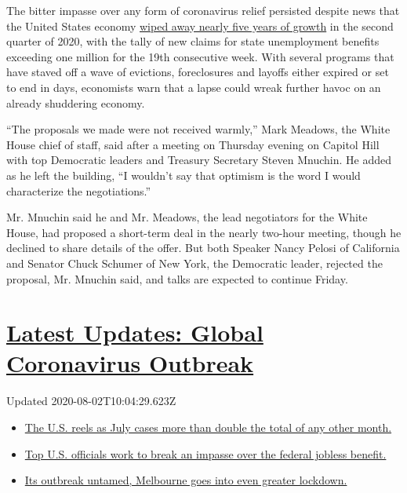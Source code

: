 The bitter impasse over any form of coronavirus relief persisted despite
news that the United States economy
\href{https://www.nytimes.com/2020/07/30/business/economy/q2-gdp-coronavirus-economy.html}{wiped
away nearly five years of growth} in the second quarter of 2020, with
the tally of new claims for state unemployment benefits exceeding one
million for the 19th consecutive week. With several programs that have
staved off a wave of evictions, foreclosures and layoffs either expired
or set to end in days, economists warn that a lapse could wreak further
havoc on an already shuddering economy.

``The proposals we made were not received warmly,'' Mark Meadows, the
White House chief of staff, said after a meeting on Thursday evening on
Capitol Hill with top Democratic leaders and Treasury Secretary Steven
Mnuchin. He added as he left the building, ``I wouldn't say that
optimism is the word I would characterize the negotiations.''

Mr. Mnuchin said he and Mr. Meadows, the lead negotiators for the White
House, had proposed a short-term deal in the nearly two-hour meeting,
though he declined to share details of the offer. But both Speaker Nancy
Pelosi of California and Senator Chuck Schumer of New York, the
Democratic leader, rejected the proposal, Mr. Mnuchin said, and talks
are expected to continue Friday.

\hypertarget{latest-updates-global-coronavirus-outbreak}{%
\section{\texorpdfstring{\href{https://www.nytimes.com/2020/08/01/world/coronavirus-covid-19.html?action=click\&pgtype=Article\&state=default\&region=MAIN_CONTENT_1\&context=storylines_live_updates}{Latest
Updates: Global Coronavirus
Outbreak}}{Latest Updates: Global Coronavirus Outbreak}}\label{latest-updates-global-coronavirus-outbreak}}

Updated 2020-08-02T10:04:29.623Z

\begin{itemize}
\tightlist
\item
  \href{https://www.nytimes.com/2020/08/01/world/coronavirus-covid-19.html?action=click\&pgtype=Article\&state=default\&region=MAIN_CONTENT_1\&context=storylines_live_updates\#link-34047410}{The
  U.S. reels as July cases more than double the total of any other
  month.}
\item
  \href{https://www.nytimes.com/2020/08/01/world/coronavirus-covid-19.html?action=click\&pgtype=Article\&state=default\&region=MAIN_CONTENT_1\&context=storylines_live_updates\#link-780ec966}{Top
  U.S. officials work to break an impasse over the federal jobless
  benefit.}
\item
  \href{https://www.nytimes.com/2020/08/01/world/coronavirus-covid-19.html?action=click\&pgtype=Article\&state=default\&region=MAIN_CONTENT_1\&context=storylines_live_updates\#link-2bc8948}{Its
  outbreak untamed, Melbourne goes into even greater lockdown.}
\end{itemize}

